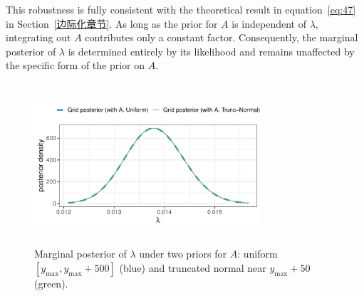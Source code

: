 This robustness is fully consistent with the theoretical result in equation~\eqref{eq:47} in Section~\ref{边际化章节}. As long as the prior for $A$ is independent of $\lambda$, integrating out $A$ contributes only a constant factor. Consequently, the marginal posterior of $\lambda$ is determined entirely by its likelihood and remains unaffected by the specific form of the prior on $A$.
\begin{figure}[H]
    \centering
    \includegraphics[height=6cm, width=0.75\textwidth]{images/diff_A_prior_marginal_compare.pdf}
    \caption{{\small Marginal posterior of $\lambda$ under two priors for $A$: uniform $[y_{\max}, y_{\max}+500]$ (blue) and truncated normal near $y_{\max}+50$ (green).}}
    \label{fig:diff_A_marginal}
\end{figure}

